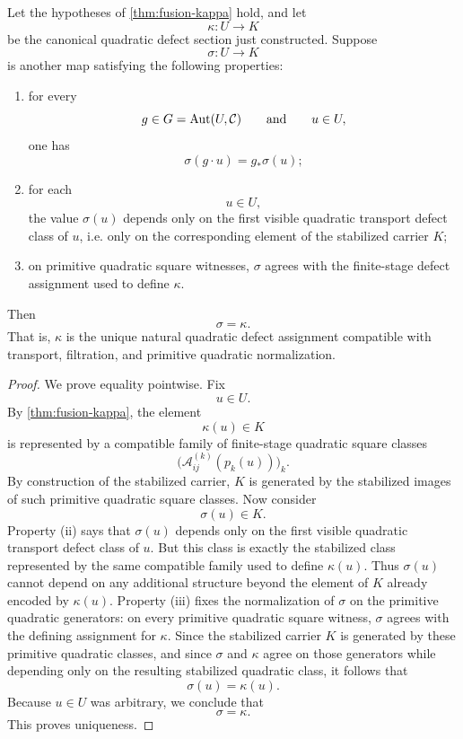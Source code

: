 \begin{theorem}
	Let the hypotheses of \cref{thm:fusion-kappa} hold, and let
	\[
		\kappa:U\to K
	\]
	be the canonical quadratic defect section just constructed.
	Suppose
	\[
		\sigma:U\to K
	\]
	is another map satisfying the following properties:
	\begin{enumerate}[label=\textup{(\roman*)}]
		\item
		      for every
		      \[
			      g\in G=\operatorname{Aut}(U,\mathcal C)
			      \qquad\text{and}\qquad
			      u\in U,
		      \]
		      one has
		      \[
			      \sigma(g\cdot u)=g_*\sigma(u);
		      \]
		\item
		      for each
		      \[
			      u\in U,
		      \]
		      the value \(\sigma(u)\) depends only on the first visible quadratic
		      transport defect class of \(u\), i.e. only on the corresponding element
		      of the stabilized carrier \(K\);
		\item
		      on primitive quadratic square witnesses, \(\sigma\) agrees with the
		      finite-stage defect assignment used to define \(\kappa\).
	\end{enumerate}
	Then
	\[
		\sigma=\kappa.
	\]
	That is, \(\kappa\) is the unique natural quadratic defect assignment
	compatible with transport, filtration, and primitive quadratic
	normalization.
\end{theorem}
\begin{proof}
	We prove equality pointwise.
	Fix
	\[
		u\in U.
	\]
	By \cref{thm:fusion-kappa}, the element
	\[
		\kappa(u)\in K
	\]
	is represented by a compatible family of finite-stage quadratic square
	classes
	\[
		\bigl(\mathcal A_{ij}^{(k)}(p_k(u))\bigr)_k.
	\]
	By construction of the stabilized carrier, \(K\) is generated by the
	stabilized images of such primitive quadratic square classes.
	Now consider
	\[
		\sigma(u)\in K.
	\]
	Property \textup{(ii)} says that \(\sigma(u)\) depends only on the first
	visible quadratic transport defect class of \(u\). But this class is
	exactly the stabilized class represented by the same compatible family
	used to define \(\kappa(u)\). Thus \(\sigma(u)\) cannot depend on any
	additional structure beyond the element of \(K\) already encoded by
	\(\kappa(u)\).
	Property \textup{(iii)} fixes the normalization of \(\sigma\) on the
	primitive quadratic generators: on every primitive quadratic square
	witness, \(\sigma\) agrees with the defining assignment for \(\kappa\).
	Since the stabilized carrier \(K\) is generated by these primitive
	quadratic classes, and since \(\sigma\) and \(\kappa\) agree on those
	generators while depending only on the resulting stabilized quadratic
	class, it follows that
	\[
		\sigma(u)=\kappa(u).
	\]
	Because \(u\in U\) was arbitrary, we conclude that
	\[
		\sigma=\kappa.
	\]
	This proves uniqueness.
\end{proof}
